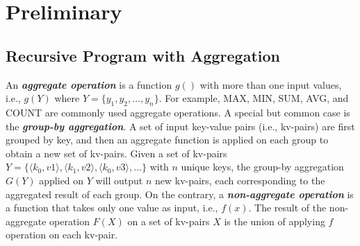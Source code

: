 \section{Preliminary}
\label{sec:async}

\subsection{Recursive Program with Aggregation}

 An \emph{\textbf{aggregate operation}} is a function $g()$ with more than one input values, i.e., $g(Y)$ where $Y=\{y_1, y_2, \ldots, y_n\}$. For example, MAX, MIN, SUM, AVG, and COUNT are commonly used aggregate operations. A special but common case is the \emph{\textbf{group-by aggregation}}. A set of input key-value pairs (i.e., kv-pairs) are first grouped by key, and then an aggregate function is applied on each group to obtain a new set of kv-pairs. Given a set of kv-pairs $Y=\{\langle k_0,v1\rangle,\langle k_1,v2\rangle,\langle k_0,v3\rangle,\ldots\}$ with $n$ unique keys, the group-by aggregation $G(Y)$ applied on $Y$ will output $n$ new kv-pairs, each corresponding to the aggregated result of each group. On the contrary, a \emph{\textbf{non-aggregate operation}} is a function that takes only one value as input, i.e., $f(x)$. The result of the non-aggregate operation $F(X)$ on a set of kv-pairs $X$ is the union of applying $f$ operation on each kv-pair.

